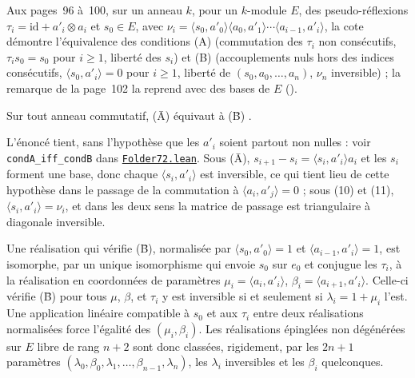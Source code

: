 Aux pages~96 à~100, sur un anneau $k$, pour un $k$-module $E$, des pseudo-réflexions $\tau_i = \mathrm{id} + a'_i \otimes a_i$ et $s_0 \in E$, avec $\nu_i = \langle s_0, a'_0\rangle\langle a_0, a'_1\rangle \cdots \langle a_{i-1}, a'_i\rangle$, la cote démontre l'équivalence des conditions (A) (commutation des $\tau_i$ non consécutifs, $\tau_i s_0 = s_0$ pour $i \geq 1$, liberté des $s_i$) et (B) (accouplements nuls hors des indices consécutifs, $\langle s_0, a'_i\rangle = 0$ pour $i \geq 1$, liberté de $(s_0, a_0, \dots, a_n)$, $\nu_n$ inversible) ; la remarque de la page~102 la reprend avec des bases de $E$ ().

\begin{encadre}
\begin{theoreme}
Sur tout anneau commutatif, (Ā)  équivaut à (B̄) .
\end{theoreme}
\end{encadre}

\noindent L'énoncé tient, sans l'hypothèse que les $a'_i$ soient partout non nulles : voir \texttt{condA\_iff\_condB} dans \href{\leanblob/Geometry/Folder72.lean}{\texttt{Folder72.\allowbreak{}lean}}. Sous (Ā), $s_{i+1} - s_i = \langle s_i, a'_i\rangle a_i$ et les $s_i$ forment une base, donc chaque $\langle s_i, a'_i\rangle$ est inversible, ce qui tient lieu de cette hypothèse dans le passage de la commutation à $\langle a_i, a'_j\rangle = 0$ ; sous (10) et (11), $\langle s_i, a'_i\rangle = \nu_i$, et dans les deux sens la matrice de passage est triangulaire à diagonale inversible.

\begin{encadre}
\begin{theoreme}
Une réalisation qui vérifie (B̄), normalisée par $\langle s_0, a'_0\rangle = 1$ et $\langle a_{i-1}, a'_i\rangle = 1$, est isomorphe, par un unique isomorphisme qui envoie $s_0$ sur $e_0$ et conjugue les $\tau_i$, à la réalisation en coordonnées de paramètres $\mu_i = \langle a_i, a'_i\rangle$, $\beta_i = \langle a_{i+1}, a'_i\rangle$. Celle-ci vérifie (B̄) pour tous $\mu$, $\beta$, et $\tau_i$ y est inversible si et seulement si $\lambda_i = 1 + \mu_i$ l'est. Une application linéaire compatible à $s_0$ et aux $\tau_i$ entre deux réalisations normalisées force l'égalité des $(\mu_i, \beta_i)$. Les réalisations épinglées non dégénérées sur $E$ libre de rang $n+2$ sont donc classées, rigidement, par les $2n+1$ paramètres $(\lambda_0, \beta_0, \lambda_1, \dots, \beta_{n-1}, \lambda_n)$, les $\lambda_i$ inversibles et les $\beta_i$ quelconques.
\end{theoreme}
\end{encadre}

